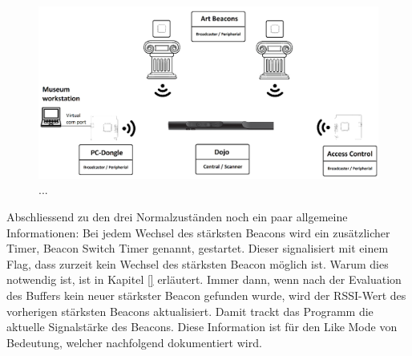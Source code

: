 \begin{figure}[h]
	\centering
	\includegraphics[width=\textwidth]{graphics/platzhalter.png}
	\caption{ ... }
	\label{fig:soft_3}
\end{figure}
Abschliessend zu den drei Normalzuständen noch ein paar allgemeine Informationen: Bei jedem Wechsel des stärksten Beacons wird ein zusätzlicher Timer, Beacon Switch Timer genannt, gestartet. Dieser signalisiert mit einem Flag, dass zurzeit kein Wechsel des stärksten Beacon möglich ist. Warum dies notwendig ist, ist in Kapitel \ref{} erläutert. Immer dann, wenn nach der Evaluation des Buffers kein neuer stärkster Beacon gefunden wurde, wird der RSSI-Wert des vorherigen stärksten Beacons aktualisiert. Damit trackt das Programm die aktuelle Signalstärke des Beacons. Diese Information ist für den Like Mode von Bedeutung, welcher nachfolgend dokumentiert wird.
